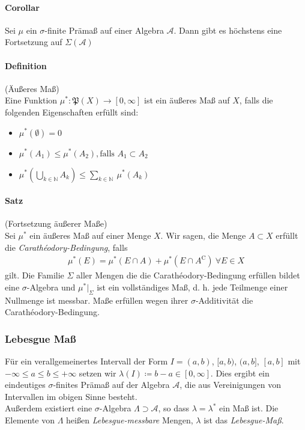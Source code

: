 \documentclass[12pt,a4paper,fleqn]{article}
\begin{document}
\paragraph{Corollar} Sei $\mu$ ein $\sigma$-finite Prämaß auf einer Algebra $\mathcal{A}$. Dann gibt es höchstens eine Fortsetzung auf $\Sigma(\mathcal{A})$

\paragraph{Definition} (Äußeres Maß)\\
Eine Funktion $\mu^*\colon \mathfrak{P}(X) \rightarrow [0, \infty]$ ist ein äußeres Maß auf $X$, falls die folgenden Eigenschaften erfüllt sind:
\begin{itemize}
\item$\mu^*(\emptyset) = 0$
\item$\mu^*(A_1) \leq \mu^*(A_2), \text{falls } A_1 \subset A_2$
\item$\mu^*(\bigcup_{k \in \mathbb{N}}A_k) \leq \sum_{k \in \mathbb{N}}\ \mu^*(A_k)$
\end{itemize}

\paragraph{Satz} (Fortsetzung äußerer Maße)\\
Sei $\mu^*$ ein äußeres Maß auf einer Menge $X$. Wir sagen, die Menge $A \subset X$ erfüllt die \textit{Carathéodory-Bedingung}, falls 
\begin{align*}
\mu^*(E) = \mu^*(E\cap A) + \mu^*(E \cap A^\mathrm{C})\ \forall E \in X
\end{align*}
gilt. Die Familie $\Sigma$ aller Mengen die die Carathéodory-Bedingung erfüllen bildet eine $\sigma$-Algebra und $\mu^*\vert_\Sigma$ ist ein vollständiges Maß, d. h. jede Teilmenge einer Nullmenge ist messbar. Maße erfüllen wegen ihrer $\sigma$-Additivität die Carathéodory-Bedingung.

\subsubsection*{Lebesgue Maß}
Für ein verallgemeinertes Intervall der Form $I = (a, b)$, $[a, b)$, $(a, b]$, $[a, b]$ mit\linebreak \mbox{$-\infty \leq a \leq b \leq +\infty$} setzen wir $\lambda(I) \coloneqq b - a \in [0, \infty]$. Dies ergibt ein eindeutiges $\sigma$-finites Prämaß auf der Algebra $\mathcal{A}$, die aus Vereinigungen von Intervallen im obigen Sinne besteht.\\
Außerdem existiert eine $\sigma$-Algebra $\Lambda \supset \mathcal{A}$, so dass $\lambda = \lambda^*$ ein Maß ist. Die Elemente von $\Lambda$ heißen \textit{Lebesgue-messbare} Mengen, $\lambda$ ist das \textit{Lebesgue-Maß}.
\end{document}
